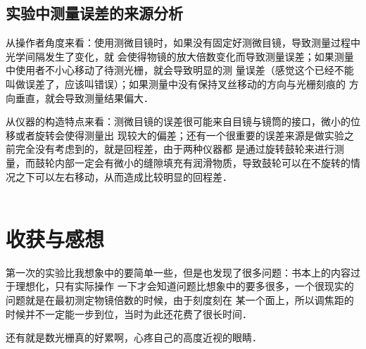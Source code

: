 			\subsection{实验中测量误差的来源分析}
			\par
			从操作者角度来看：使用测微目镜时，如果没有固定好测微目镜，导致测量过程中光学间隔发生了变化，就
			会使得物镜的放大倍数变化而导致测量误差；如果测量中使用者不小心移动了待测光栅，就会导致明显的测
			量误差（感觉这个已经不能叫做误差了，应该叫错误）；如果测量中没有保持叉丝移动的方向与光栅刻痕的
			方向垂直，就会导致测量结果偏大．
			\par
			从仪器的构造特点来看：测微目镜的误差很可能来自目镜与镜筒的接口，微小的位移或者旋转会使得测量出
			现较大的偏差；还有一个很重要的误差来源是做实验之前完全没有考虑到的，就是回程差，由于两种仪器都
			是通过旋转鼓轮来进行测量，而鼓轮内部一定会有微小的缝隙填充有润滑物质，导致鼓轮可以在不旋转的情
			况之下可以左右移动，从而造成比较明显的回程差．\\
			\\
		\section{\Large{收获与感想}}
			\par
			第一次的实验比我想象中的要简单一些，但是也发现了很多问题：书本上的内容过于理想化，只有实际操作
			一下才会知道问题比想象中的要多很多，一个很现实的问题就是在最初测定物镜倍数的时候，由于刻度刻在
			某一个面上，所以调焦距的时候并不一定能一步到位，当时为此还花费了很长时间．
			\par
			还有就是数光栅真的好累啊，心疼自己的高度近视的眼睛．
